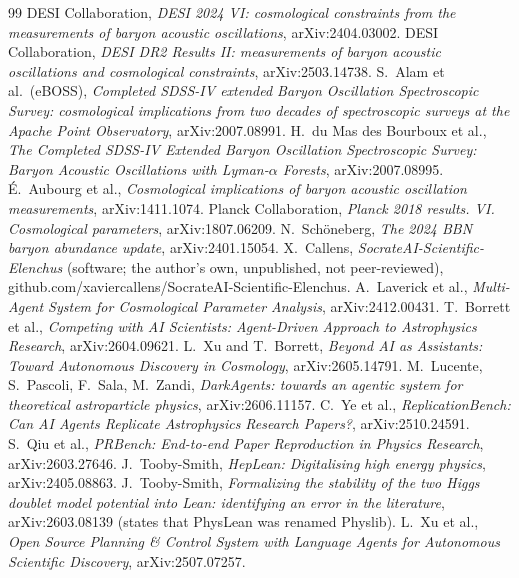 \documentclass[11pt]{article}
\begin{document}
\begin{thebibliography}{99}
 DESI Collaboration, \emph{DESI 2024 VI: cosmological constraints from the measurements of baryon acoustic oscillations}, arXiv:2404.03002.
 DESI Collaboration, \emph{DESI DR2 Results II: measurements of baryon acoustic oscillations and cosmological constraints}, arXiv:2503.14738.
 S.~Alam et al.\ (eBOSS), \emph{Completed SDSS-IV extended Baryon Oscillation Spectroscopic Survey: cosmological implications from two decades of spectroscopic surveys at the Apache Point Observatory}, arXiv:2007.08991.
 H.~du Mas des Bourboux et al., \emph{The Completed SDSS-IV Extended Baryon Oscillation Spectroscopic Survey: Baryon Acoustic Oscillations with Lyman-$\alpha$ Forests}, arXiv:2007.08995.
 \'E.~Aubourg et al., \emph{Cosmological implications of baryon acoustic oscillation measurements}, arXiv:1411.1074.
 Planck Collaboration, \emph{Planck 2018 results. VI. Cosmological parameters}, arXiv:1807.06209.
 N.~Sch\"oneberg, \emph{The 2024 BBN baryon abundance update}, arXiv:2401.15054.
 X.~Callens, \emph{SocrateAI-Scientific-Elenchus} (software; the author's own, unpublished, not peer-reviewed), github.com/xaviercallens/SocrateAI-Scientific-Elenchus.
 A.~Laverick et al., \emph{Multi-Agent System for Cosmological Parameter Analysis}, arXiv:2412.00431.
 T.~Borrett et al., \emph{Competing with AI Scientists: Agent-Driven Approach to Astrophysics Research}, arXiv:2604.09621.
 L.~Xu and T.~Borrett, \emph{Beyond AI as Assistants: Toward Autonomous Discovery in Cosmology}, arXiv:2605.14791.
 M.~Lucente, S.~Pascoli, F.~Sala, M.~Zandi, \emph{DarkAgents: towards an agentic system for theoretical astroparticle physics}, arXiv:2606.11157.
 C.~Ye et al., \emph{ReplicationBench: Can AI Agents Replicate Astrophysics Research Papers?}, arXiv:2510.24591.
 S.~Qiu et al., \emph{PRBench: End-to-end Paper Reproduction in Physics Research}, arXiv:2603.27646.
 J.~Tooby-Smith, \emph{HepLean: Digitalising high energy physics}, arXiv:2405.08863.
 J.~Tooby-Smith, \emph{Formalizing the stability of the two Higgs doublet model potential into Lean: identifying an error in the literature}, arXiv:2603.08139 (states that PhysLean was renamed Physlib).
 L.~Xu et al., \emph{Open Source Planning \& Control System with Language Agents for Autonomous Scientific Discovery}, arXiv:2507.07257.

\end{thebibliography}
\end{document}
